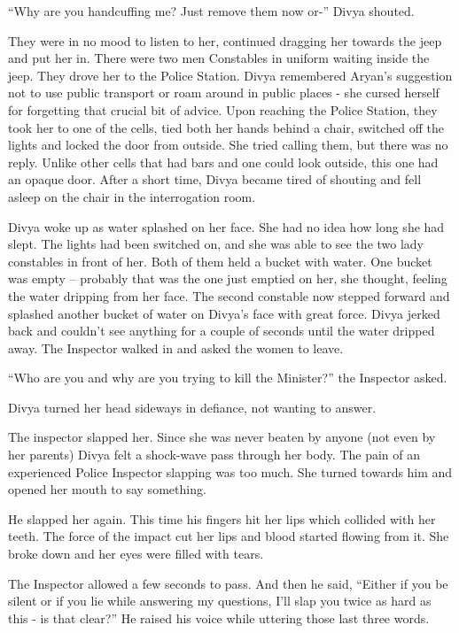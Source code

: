 “Why are you handcuffing me? Just remove them now or-” Divya shouted.

They were in no mood to listen to her, continued dragging her towards the jeep
and put her in. There were two men Constables in uniform waiting inside the
jeep. They drove her to the Police Station. Divya remembered Aryan's suggestion
not to use public transport or roam around in public places - she cursed herself
for forgetting that crucial bit of advice. Upon reaching the Police Station,
they took her to one of the cells, tied both her hands behind a chair, switched
off the lights and locked the door from outside. She tried calling them, but
there was no reply. Unlike other cells that had bars and one could look outside,
this one had an opaque door. After a short time, Divya became tired of shouting
and fell asleep on the chair in the interrogation room.

Divya woke up as water splashed on her face. She had no idea how long she had
slept. The lights had been switched on, and she was able to see the two lady
constables in front of her. Both of them held a bucket with water. One bucket
was empty – probably that was the one just emptied on her, she thought, feeling
the water dripping from her face. The second constable now stepped forward and
splashed another bucket of water on Divya's face with great force. Divya jerked
back and couldn't see anything for a couple of seconds until the water dripped
away. The Inspector walked in and asked the women to leave.

“Who are you and why are you trying to kill the Minister?” the Inspector asked.

Divya turned her head sideways in defiance, not wanting to answer.

The inspector slapped her. Since she was never beaten by anyone (not even by her
parents) Divya felt a shock-wave pass through her body. The pain of an
experienced Police Inspector slapping was too much. She turned towards him and
opened her mouth to say something.

He slapped her again. This time his fingers hit her lips which collided with her
teeth. The force of the impact cut her lips and blood started flowing from it.
She broke down and her eyes were filled with tears.

The Inspector allowed a few seconds to pass. And then he said, “Either if you be
silent or if you lie while answering my questions, I'll slap you twice as hard
as this - is that clear?” He raised his voice while uttering those last three
words.

